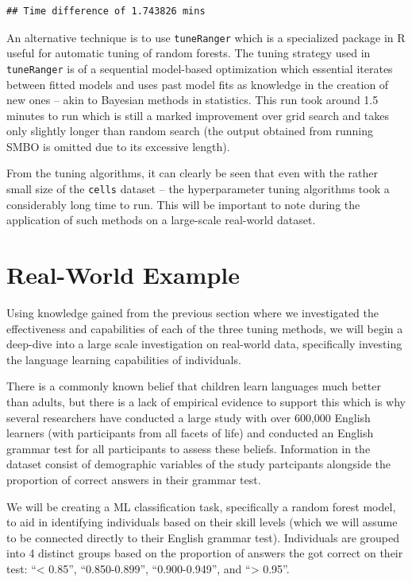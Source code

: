 \documentclass[12pt]{article}
\begin{document}
\begin{verbatim}
## Time difference of 1.743826 mins
\end{verbatim}

An alternative technique is to use \texttt{tuneRanger} which is a
specialized package in R useful for automatic tuning of random forests.
The tuning strategy used in \texttt{tuneRanger} is of a sequential
model-based optimization which essential iterates between fitted models
and uses past model fits as knowledge in the creation of new ones --
akin to Bayesian methods in statistics. This run took around 1.5 minutes
to run which is still a marked improvement over grid search and takes
only slightly longer than random search (the output obtained from
running SMBO is omitted due to its excessive length).

From the tuning algorithms, it can clearly be seen that even with the
rather small size of the \texttt{cells} dataset -- the hyperparameter
tuning algorithms took a considerably long time to run. This will be
important to note during the application of such methods on a
large-scale real-world dataset.

\newpage

\hypertarget{real-world-example}{%
\section{Real-World Example}\label{real-world-example}}

\label{sec:realworld}

Using knowledge gained from the previous section where we investigated
the effectiveness and capabilities of each of the three tuning methods,
we will begin a deep-dive into a large scale investigation on real-world
data, specifically investing the language learning capabilities of
individuals.

There is a commonly known belief that children learn languages much
better than adults, but there is a lack of empirical evidence to support
this which is why several researchers have conducted a large study with
over 600,000 English learners (with participants from all facets of
life) and conducted an English grammar test for all participants to
assess these beliefs. Information in the dataset consist of demographic
variables of the study partcipants alongside the proportion of correct
answers in their grammar test.

We will be creating a ML classification task, specifically a random
forest model, to aid in identifying individuals based on their skill
levels (which we will assume to be connected directly to their English
grammar test). Individuals are grouped into 4 distinct groups based on
the proportion of answers the got correct on their test: ``\textless{}
0.85'', ``0.850-0.899'', ``0.900-0.949'', and ``\textgreater{} 0.95''.
\end{document}
